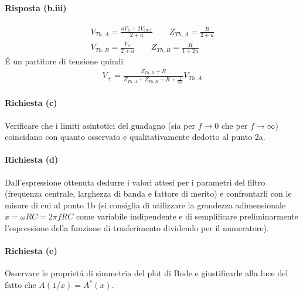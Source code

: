 \paragraph{Risposta (b.iii)}
\begin{equation*}
  \begin{gathered}
    V_{Th, A} = \frac{uV_S + 2V_{OUT}}{2 + u} \qquad
    Z_{Th, A} = \frac{R}{2 + u} \\
    V_{Th, B} = \frac{V_S}{2 + u} \qquad
    Z_{Th, B} = \frac{R}{1 + 2u}
  \end{gathered}
\end{equation*}
\'E un partitore di tensione quindi
\begin{equation*}
  \begin{gathered}
    V_+ = \frac{Z_{Th, B} + R}{Z_{Th, A} + Z_{Th, B} + R + \frac{1}{sC}}V_{Th, A}
  \end{gathered}
\end{equation*}

\paragraph{Richiesta (c)}
Verificare che i limiti asintotici del guadagno (sia per $f \to 0$ che per $f \to \infty$) coincidano
con quanto osservato e qualitativamente dedotto al punto 2a.

\paragraph{Richiesta (d)}
Dall'espressione ottenuta dedurre i valori attesi per i parametri del filtro (frequenza
centrale, larghezza di banda e fattore di merito) e confrontarli con le misure di cui al
punto 1b (si consiglia di utilizzare la grandezza adimensionale $x = \omega RC = 2\pi fRC$
come variabile indipendente e di semplificare preliminarmente l'espressione della funzione
di trasferimento dividendo per il numeratore).

\paragraph{Richiesta (e)}
Osservare le propriet\'a di simmetria del plot di Bode e giustificarle alla luce
del fatto che $A(1/x) = A^*(x)$.
